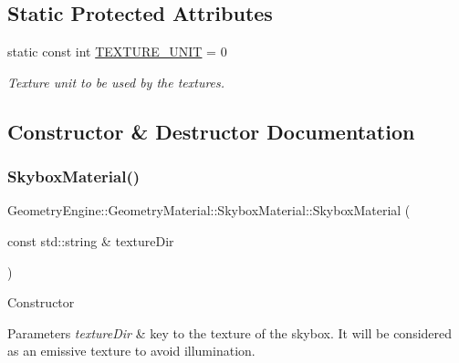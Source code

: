 \subsection*{Static Protected Attributes}
\begin{DoxyCompactItemize}
\item 
\mbox{\label{class_geometry_engine_1_1_geometry_material_1_1_skybox_material_a0cb45513a44851f20d3451aae3792aeb}} 
static const int \mbox{\hyperlink{class_geometry_engine_1_1_geometry_material_1_1_skybox_material_a0cb45513a44851f20d3451aae3792aeb}{T\+E\+X\+T\+U\+R\+E\+\_\+\+U\+N\+IT}} = 0
\begin{DoxyCompactList}\small\item\em Texture unit to be used by the textures. \end{DoxyCompactList}\end{DoxyCompactItemize}


\subsection{Constructor \& Destructor Documentation}
\mbox{\label{class_geometry_engine_1_1_geometry_material_1_1_skybox_material_a7cc6c7bb2246caad7f2eead65acb7bd8}} 
\subsubsection{\texorpdfstring{SkyboxMaterial()}{SkyboxMaterial()}\hspace{0.1cm}{\footnotesize\ttfamily [1/3]}}
{\footnotesize\ttfamily Geometry\+Engine\+::\+Geometry\+Material\+::\+Skybox\+Material\+::\+Skybox\+Material (\begin{DoxyParamCaption}\item[{const std\+::string \&}]{texture\+Dir }\end{DoxyParamCaption})}

Constructor 
\begin{DoxyParams}{Parameters}
{\em texture\+Dir} & key to the texture of the skybox. It will be considered as an emissive texture to avoid illumination. \\
\hline
\end{DoxyParams}
\mbox{\label{class_geometry_engine_1_1_geometry_material_1_1_skybox_material_a36e098e2d744596441ed450effcf8160}} 

